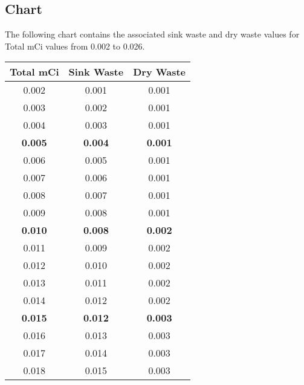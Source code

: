 \documentclass[12pt, letterpaper]{article}
\begin{document}
\FloatBarrier

\subsection{Chart}
The following chart contains the associated sink waste and dry waste values for Total mCi values from 0.002 to 0.026.

\begin{table}[ht]
    \centering
    \begin{tabular}{|c|c|c|}
    \hline
    \textbf{Total mCi} & \textbf{Sink Waste} & \textbf{Dry Waste} \\ \hline
    0.002              & 0.001               & 0.001              \\ \hline
    0.003              & 0.002               & 0.001              \\ \hline
    0.004              & 0.003               & 0.001              \\ \hline
    \textbf{0.005}     & \textbf{0.004}      & \textbf{0.001}     \\ \hline
    0.006              & 0.005               & 0.001              \\ \hline
    0.007              & 0.006               & 0.001              \\ \hline
    0.008              & 0.007               & 0.001              \\ \hline
    0.009              & 0.008               & 0.001              \\ \hline
    \textbf{0.010}     & \textbf{0.008}      & \textbf{0.002}     \\ \hline
    0.011              & 0.009               & 0.002              \\ \hline
    0.012              & 0.010               & 0.002              \\ \hline
    0.013              & 0.011               & 0.002              \\ \hline
    0.014              & 0.012               & 0.002              \\ \hline
    \textbf{0.015}     & \textbf{0.012}      & \textbf{0.003}     \\ \hline
    0.016              & 0.013               & 0.003              \\ \hline
    0.017              & 0.014               & 0.003              \\ \hline
    0.018              & 0.015               & 0.003              \\ \hline

\end{tabular}
\end{table}
\end{document}
